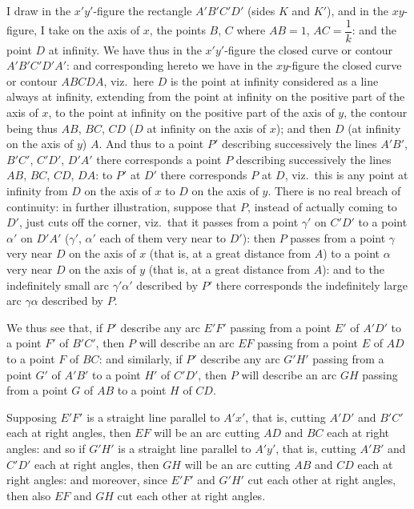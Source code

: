 \documentclass[11pt,a4paper]{book}
\begin{document}
I draw in the $x'y'$-figure the rectangle $A'B'C'D'$ (sides $K$ and $K'$), and in the $xy$-figure, I take on the axis of $x$, the points $B$, $C$ where $AB=1$, $AC=\dfrac{1}{k}$: and the point $D$ at infinity. We have thus in the $x'y'$-figure the closed curve or contour $A'B'C'D'A'$: and corresponding hereto we have in the $xy$-figure the closed curve or contour $ABCDA$, viz.\ here $D$ is the point at infinity considered as a line always at infinity, extending from the point at infinity on the positive part of the axis of $x$, to the point at infinity on the positive part of the axis of $y$, the contour being thus $AB$, $BC$, $CD$ ($D$ at infinity on the axis of $x$); and then $D$ (at infinity on the axis of $y$) $A$. And thus to a point $P'$ describing successively the lines $A'B'$, $B'C'$, $C'D'$, $D'A'$ there corresponds a point $P$ describing successively the lines $AB$, $BC$, $CD$, $DA$: to $P'$ at $D'$ there corresponds $P$ at $D$, viz.\ this is any point at infinity from $D$ on the axis of $x$ to $D$ on the axis of $y$. There is no real breach of continuity: in further illustration, suppose that $P$, instead of actually coming to $D'$, just cuts off the corner, viz.\ that it passes from a point $\gamma'$ on $C'D'$ to a point $\alpha'$ on $D'A'$ ($\gamma'$, $\alpha'$ each of them very near to $D'$): then $P$ passes from a point $\gamma$ very near $D$ on the axis of $x$ (that is, at a great distance from $A$) to a point $\alpha$ very near $D$ on the axis of $y$ (that is, at a great distance from $A$): and to the indefinitely small arc $\gamma'\alpha'$ described by $P'$ there corresponds the indefinitely large arc $\gamma\alpha$ described by $P$.

We thus see that, if $P'$ describe any arc $E'F'$ passing from a point $E'$ of $A'D'$ to a point $F'$ of $B'C'$, then $P$ will describe an arc $EF$ passing from a point $E$ of $AD$ to a point $F$ of $BC$: and similarly, if $P'$ describe any arc $G'H'$ passing from a point $G'$ of $A'B'$ to a point $H'$ of $C'D'$, then $P$ will describe an arc $GH$ passing from a point $G$ of $AB$ to a point $H$ of $CD$.

Supposing $E'F'$ is a straight line parallel to $A'x'$, that is, cutting $A'D'$ and $B'C'$ each at right angles, then $EF$ will be an arc cutting $AD$ and $BC$ each at right angles: and so if $G'H'$ is a straight line parallel to $A'y'$, that is, cutting $A'B'$ and $C'D'$ each at right angles, then $GH$ will be an arc cutting $AB$ and $CD$ each at right angles: and moreover, since $E'F'$ and $G'H'$ cut each other at right angles, then also $EF$ and $GH$ cut each other at right angles.
\end{document}
